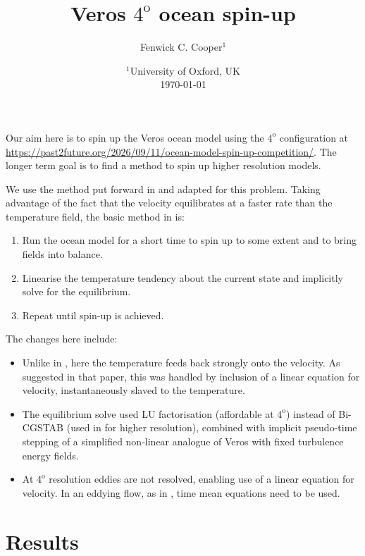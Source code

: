 \documentclass{article}
\title{Veros $4^{\text{o}}$ ocean spin-up}
\author{Fenwick C. Cooper$^1$}
\date{%
    $^1$University of Oxford, UK \\[2ex]
    \today
}
\begin{document}
\maketitle

Our aim here is to spin up the Veros ocean model using the $4^{\text{o}}$ configuration at \url{https://past2future.org/2026/09/11/ocean-model-spin-up-competition/}. The longer term goal is to find a method to spin up higher resolution models.

We use the method put forward in \cite{Cooper2017} and adapted for this problem. Taking advantage of the fact that the velocity equilibrates at a faster rate than the temperature field, the basic method in \cite{Cooper2017} is:
\begin{enumerate}
\item Run the ocean model for a short time to spin up to some extent and to bring fields into balance.
\item Linearise the temperature tendency about the current state and implicitly solve for the equilibrium.
\item Repeat until spin-up is achieved.
\end{enumerate}
The changes here include:
\begin{itemize}
\item Unlike in \cite{Cooper2017}, here the temperature feeds back strongly onto the velocity. As suggested in that paper, this was handled by inclusion of a linear equation for velocity, instantaneously slaved to the temperature.
\item The equilibrium solve used LU factorisation (affordable at $4^{\text{o}}$) instead of Bi-CGSTAB (used in \cite{Cooper2017} for higher resolution), combined with implicit pseudo-time stepping \cite{kelleykeyes1998} of a simplified non-linear analogue of Veros with fixed turbulence energy fields.
\item At $4^{\text{o}}$ resolution eddies are not resolved, enabling use of a linear equation for velocity. In an eddying flow, as in \cite{Cooper2017}, time mean equations need to be used.
\end{itemize}

\section*{Results}
\end{document}
